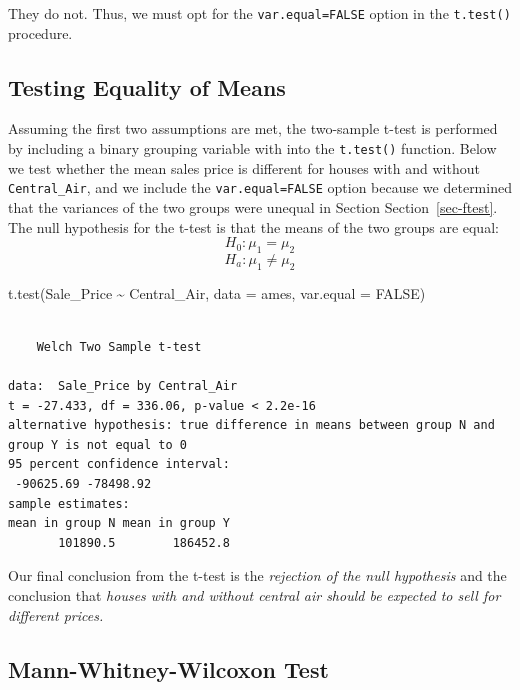 \documentclass[
  letterpaper,
  DIV=11,
  numbers=noendperiod]{scrreprt}
\newenvironment{Shaded}{\begin{snugshade}}{\end{snugshade}}
\newcommand{\AttributeTok}[1]{\textcolor[rgb]{0.40,0.45,0.13}{#1}}
\newcommand{\ConstantTok}[1]{\textcolor[rgb]{0.56,0.35,0.01}{#1}}
\newcommand{\FunctionTok}[1]{\textcolor[rgb]{0.28,0.35,0.67}{#1}}
\newcommand{\NormalTok}[1]{\textcolor[rgb]{0.00,0.23,0.31}{#1}}
\newcommand{\SpecialCharTok}[1]{\textcolor[rgb]{0.37,0.37,0.37}{#1}}
\begin{document}
They do not. Thus, we must opt for the \texttt{var.equal=FALSE} option
in the \texttt{t.test()} procedure.

\hypertarget{sec-tsttest}{%
\subsection{Testing Equality of Means}\label{sec-tsttest}}

Assuming the first two assumptions are met, the two-sample t-test is
performed by including a binary grouping variable with into the
\texttt{t.test()} function. Below we test whether the mean sales price
is different for houses with and without \texttt{Central\_Air}, and we
include the \texttt{var.equal=FALSE} option because we determined that
the variances of the two groups were unequal in Section
Section~\ref{sec-ftest}. The null hypothesis for the t-test is that the
means of the two groups are equal: \[H_0: \mu_1 = \mu_2\]
\[H_a: \mu_1 \neq \mu_2\]

\begin{Shaded}
\begin{Highlighting}[]
\FunctionTok{t.test}\NormalTok{(Sale\_Price }\SpecialCharTok{\textasciitilde{}}\NormalTok{ Central\_Air, }\AttributeTok{data =}\NormalTok{ ames, }\AttributeTok{var.equal =} \ConstantTok{FALSE}\NormalTok{)}
\end{Highlighting}
\end{Shaded}

\begin{verbatim}

    Welch Two Sample t-test

data:  Sale_Price by Central_Air
t = -27.433, df = 336.06, p-value < 2.2e-16
alternative hypothesis: true difference in means between group N and group Y is not equal to 0
95 percent confidence interval:
 -90625.69 -78498.92
sample estimates:
mean in group N mean in group Y 
       101890.5        186452.8 
\end{verbatim}

Our final conclusion from the t-test is the \emph{rejection of the null
hypothesis} and the conclusion that \emph{houses with and without
central air should be expected to sell for different prices.}

\hypertarget{sec-wilcoxon}{%
\subsection{Mann-Whitney-Wilcoxon Test}\label{sec-wilcoxon}}
\end{document}
